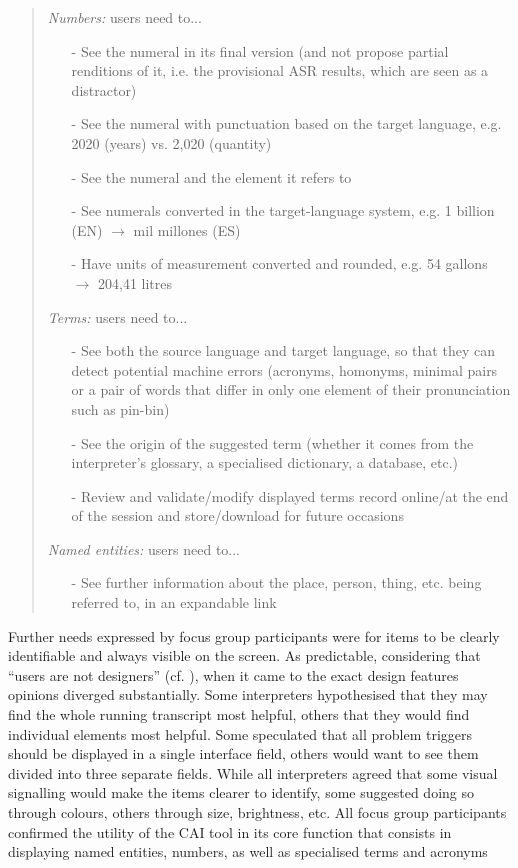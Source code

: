 \begin{quote}
    \textit{Numbers:} users need to...
    \begin{itemize}
        \item[-] See the numeral in its final version (and not propose partial renditions of it, i.e. the provisional ASR results, which are seen as a distractor)
        \item[-] See the numeral with punctuation based on the target language, e.g. 2020 (years) vs. 2,020 (quantity)
        \item[-] See the numeral and the element it refers to
        \item[-] See numerals converted in the target-language system, e.g. 1 billion (EN) $\longrightarrow$ mil millones (ES)
        \item[-] Have units of measurement converted and rounded, e.g. 54 gallons $\longrightarrow$ 204,41 litres
    \end{itemize}
    \textit{Terms:} users need to...
    \begin{itemize}
        \item[-] See both the source language and target language, so that they can detect potential machine errors (acronyms, homonyms, minimal pairs or a pair of words that differ in only one element of their pronunciation such as pin-bin)
        \item[-] See the origin of the suggested term (whether it comes from the interpreter’s glossary, a specialised dictionary, a database, etc.)
        \item[-] Review and validate/modify displayed terms record online/at the end of the session and store/download for future occasions
    \end{itemize}
    \textit{Named entities:} users need to...
    \begin{itemize}
        \item[-] See further information about the place, person, thing, etc. being referred to, in an expandable link
    \end{itemize}
\end{quote}
Further needs expressed by focus group participants were for items to be clearly identifiable and always visible on the screen. As predictable, considering that ``users are not designers'' (cf. ), when it came to the exact design features opinions diverged substantially. Some interpreters hypothesised that they may find the whole running transcript most helpful, others that they would find individual elements most helpful. Some speculated that all problem triggers should be displayed in a single interface field, others would want to see them divided into three separate fields. While all interpreters agreed that some visual signalling would make the items clearer to identify, some suggested doing so through colours, others through size, brightness, etc. All focus group participants confirmed the utility of the CAI tool in its core function that consists in displaying named entities, numbers, as well as specialised terms and acronyms




